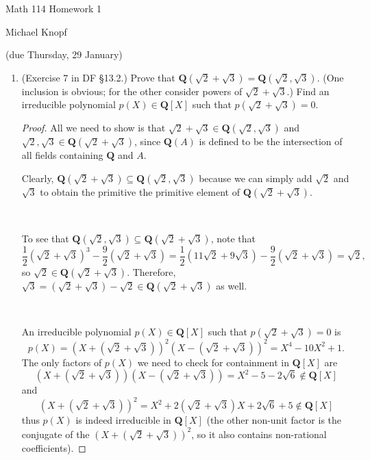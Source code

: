 \documentclass[10pt]{article}
\newcommand{\Q}{\mathbf{Q}}
\begin{document}
\begin{center}
\large Math 114 Homework 1

\large Michael Knopf

\normalsize (due Thursday, 29 January)
\end{center}



\begin{enumerate}

\item (Exercise 7 in DF \S 13.2.) Prove that $\mathbf{Q}(\sqrt{2}+\sqrt{3}) = \mathbf{Q}(\sqrt{2},\sqrt{3})$.  (One inclusion is obvious; for the other consider powers of $\sqrt{2}+\sqrt{3}$.)  Find an irreducible polynomial $p(X) \in \mathbf{Q}[X]$ such that $p(\sqrt{2}+\sqrt{3})=0$.

\begin{proof}
All we need to show is that $\sqrt{2} + \sqrt{3} \in \Q(\sqrt{2},\sqrt{3})$ and $\sqrt{2}, \sqrt{3} \in \Q(\sqrt{2}+\sqrt{3})$, since $\Q(A)$ is defined to be the intersection of all fields containing $\Q$ and $A$.


Clearly, $\Q(\sqrt{2} + \sqrt{3}) \subseteq \Q(\sqrt{2},\sqrt{3})$ because we can simply add $\sqrt{2}$ and $\sqrt{3}$ to obtain the primitive the primitive element of $\Q(\sqrt{2} + \sqrt{3})$.

\

To see that $\Q(\sqrt{2}, \sqrt{3}) \subseteq \Q(\sqrt{2} + \sqrt{3})$, note that $$\frac{1}{2}(\sqrt{2} + \sqrt{3})^3 - \frac{9}{2}(\sqrt{2}+\sqrt{3}) = \frac{1}{2}(11\sqrt{2} + 9\sqrt{3}) - \frac{9}{2}(\sqrt{2} + \sqrt{3}) = \sqrt{2},$$ so $\sqrt{2} \in \Q(\sqrt{2} + \sqrt{3})$.  Therefore, $\sqrt{3} = (\sqrt{2} + \sqrt{3}) - \sqrt{2} \in \Q(\sqrt{2} + \sqrt{3}) $ as well.

\

An irreducible polynomial $p(X) \in \Q[X]$ such that $p(\sqrt{2} + \sqrt{3}) = 0$ is $$p(X) = (X + (\sqrt{2} + \sqrt{3}))^2 (X - (\sqrt{2} + \sqrt{3}))^2 = X^4 - 10X^2 + 1.$$  The only factors of $p(X)$ we need to check for containment in $\Q[X]$ are $$(X + (\sqrt{2} + \sqrt{3}))(X - (\sqrt{2} + \sqrt{3})) = X^2 - 5 - 2\sqrt{6} \not \in \Q[X]$$ and $$(X + (\sqrt{2} + \sqrt{3}))^2 = X^2 + 2(\sqrt{2} + \sqrt{3})X + 2\sqrt{6} + 5 \not \in \Q[X]$$ thus $p(X)$ is indeed irreducible in $\Q[X]$ (the other non-unit factor is the conjugate of the $(X + (\sqrt{2} + \sqrt{3}))^2$, so it also contains non-rational coefficients).


\end{proof}
\end{enumerate}
\end{document}
